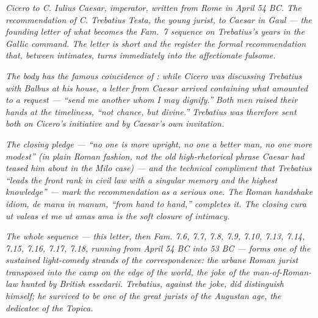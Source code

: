 
\textit{Cicero to C. Iulius Caesar, imperator, written from
Rome in April 54 BC. The recommendation of C. Trebatius
Testa, the young jurist, to Caesar in Gaul --- the founding
letter of what becomes the Fam.\ 7 sequence on Trebatius's
years in the Gallic command. The letter is short and the
register the formal recommendation that, between intimates,
turns immediately into the affectionate fulsome.}

\textit{The body has the famous coincidence of :
while Cicero was discussing Trebatius with Balbus at his
house, a letter from Caesar arrived containing what amounted
to a request --- ``send me another whom I may dignify.'' Both
men raised their hands at the timeliness, ``not chance, but
divine.'' Trebatius was therefore sent both on Cicero's
initiative and by Caesar's own invitation.}

\textit{The closing pledge --- ``no one is more upright, no
one a better man, no one more modest'' (in plain Roman fashion,
not the old high-rhetorical phrase Caesar had teased him about
in the Milo case) --- and the technical compliment that
Trebatius ``leads the front rank in civil law with a singular
memory and the highest knowledge'' --- mark the recommendation
as a serious one. The Roman handshake idiom, \textit{de manu in
manum}, ``from hand to hand,'' completes it. The closing
\textit{cura ut valeas et me ut amas ama} is the soft closure
of intimacy.}

\textit{The whole sequence --- this letter, then \textit{Fam.}
7.6, 7.7, 7.8, 7.9, 7.10, 7.13, 7.14, 7.15, 7.16, 7.17, 7.18,
running from April 54 BC into 53 BC --- forms one of the
sustained light-comedy strands of the correspondence: the
urbane Roman jurist transposed into the camp on the edge of
the world, the joke of the man-of-Roman-law hunted by
British essedarii. Trebatius, against the joke, did
distinguish himself; he survived to be one of the great
jurists of the Augustan age, the dedicatee of the
\textit{Topica}.}
